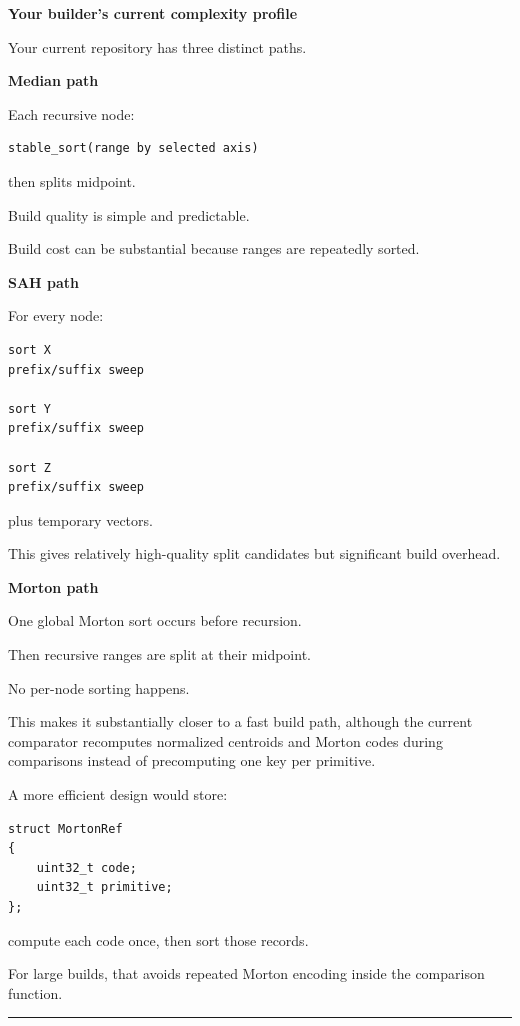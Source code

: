 \textbf{Your builder's current complexity profile}

Your current repository has three distinct paths.

\textbf{Median path}

Each recursive node:

\begin{verbatim}
stable_sort(range by selected axis)
\end{verbatim}

then splits midpoint.

Build quality is simple and predictable.

Build cost can be substantial because ranges are repeatedly sorted.

\textbf{SAH path}

For every node:

\begin{verbatim}
sort X
prefix/suffix sweep

sort Y
prefix/suffix sweep

sort Z
prefix/suffix sweep
\end{verbatim}

plus temporary  vectors.

This gives relatively high-quality split candidates but significant build overhead.

\textbf{Morton path}

One global Morton sort occurs before recursion.

Then recursive ranges are split at their midpoint.

No per-node sorting happens.

This makes it substantially closer to a fast build path, although the current  comparator recomputes normalized centroids and Morton codes during comparisons instead of precomputing one key per primitive.

A more efficient design would store:

\begin{verbatim}
struct MortonRef
{
    uint32_t code;
    uint32_t primitive;
};
\end{verbatim}

compute each code once, then sort those records.

For large builds, that avoids repeated Morton encoding inside the comparison function.

\begin{center}\rule{0.5\linewidth}{0.5pt}\end{center}

